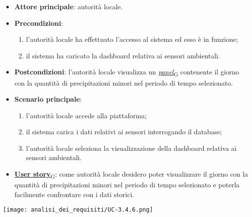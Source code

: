 \begin{itemize}
	\item \textbf{Attore principale}: autorità locale.
	\item \textbf{Precondizioni}:
	      \begin{enumerate}
		      \item l'autorità locale ha effettuato l'accesso al sistema ed esso è in funzione;
		      \item il sistema ha caricato la dashboard relativa ai sensori ambientali.
	      \end{enumerate}
	\item \textbf{Postcondizioni}: l'autorità locale visualizza un \href{https://7last.github.io/docs/pb/documentazione-interna/glossario\#panel}{\textit{panel}\textsubscript{G}} contenente il giorno con la quantità di precipitazioni minori nel periodo di tempo selezionato.
	\item \textbf{Scenario principale}:
	      \begin{enumerate}
		      \item l'autorità locale accede alla piattaforma;
		      \item il sistema carica i dati relativi ai sensori interrogando il database;
		      \item l'autorità locale seleziona la visualizzazione della dashboard relativa ai sensori ambientali.
	      \end{enumerate}
	\item \href{https://7last.github.io/docs/pb/documentazione-interna/glossario\#user-story}{\textbf{User story}\textsubscript{G}}:
	      come autorità locale desidero poter visualizzare il giorno con la quantità di precipitazioni minori nel periodo di tempo selezionato
	      e poterla facilmente confrontare con i dati storici.
\end{itemize}
\begin{center}
	\texttt{[image: analisi\_dei\_requisiti/UC-3.4.6.png]}
\end{center}


